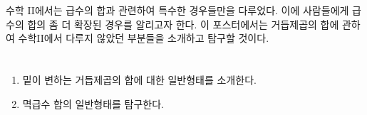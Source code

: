 \documentclass[a0,portrait]{a0poster}
\begin{document}
\vspace{1cm} %


\begin{multicols}{2} %


\color{ku}%

\begin{abstract} 
\vspace{0.2cm}
\end{abstract}



\color{Black} %

\section*{}
수학 II에서는 급수의 합과 관련하여 특수한 경우들만을 다루었다. 이에 사람들에게 급수의 합의 좀 더 확장된 경우를 알리고자 한다. 이 포스터에서는 거듭제곱의 합에 관하여 수학II에서 다루지 않았던 부분들을 소개하고 탐구할 것이다.


\color{Black}
	
\section*{}

\begin{enumerate}
\item 밑이 변하는 거듭제곱의 합에 대한 일반형태를 소개한다.
\item 멱급수 합의 일반형태를 탐구한다.
\end{enumerate}


\end{multicols}
\end{document}

